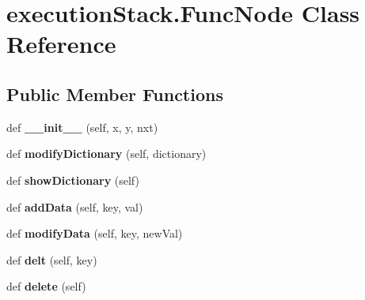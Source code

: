\hypertarget{classexecution_stack_1_1_func_node}{}\section{execution\+Stack.\+Func\+Node Class Reference}
\label{classexecution_stack_1_1_func_node}
\subsection*{Public Member Functions}
\begin{DoxyCompactItemize}
\item 
\mbox{\label{classexecution_stack_1_1_func_node_a1994532e3a182d99e343db96c08bd029}} 
def {\bfseries \+\_\+\+\_\+init\+\_\+\+\_\+} (self, x, y, nxt)
\item 
\mbox{\label{classexecution_stack_1_1_func_node_afb1bc84994052defe4aa69425ece9aaa}} 
def {\bfseries modify\+Dictionary} (self, dictionary)
\item 
\mbox{\label{classexecution_stack_1_1_func_node_a05cb49985ef531aaaadc2745ba7824ed}} 
def {\bfseries show\+Dictionary} (self)
\item 
\mbox{\label{classexecution_stack_1_1_func_node_af6781c8b076dd1640134f7a21b92a69e}} 
def {\bfseries add\+Data} (self, key, val)
\item 
\mbox{\label{classexecution_stack_1_1_func_node_ac68d3907e0cae5d0c6a8332f872898d3}} 
def {\bfseries modify\+Data} (self, key, new\+Val)
\item 
\mbox{\label{classexecution_stack_1_1_func_node_ae5ea22451e43838d450dfdd5fc5c328f}} 
def {\bfseries delt} (self, key)
\item 
\mbox{\label{classexecution_stack_1_1_func_node_a43cba9e7099e1cba625070fcb024bc84}} 
def {\bfseries delete} (self)
\end{DoxyCompactItemize}
